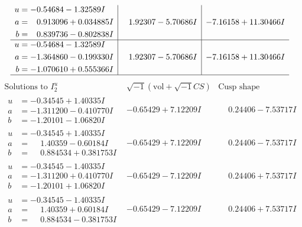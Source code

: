 \documentclass[1p]{elsarticle_modified}
\theoremstyle{definition}
\newcommand{\I}{\sqrt{-1}}
\begin{document}
$$\begin{array}{c|c|c}
\begin{aligned}
u &= -0.54684 - 1.32589 I \\
a &= \phantom{-}0.913096 + 0.034885 I \\
b &= \phantom{-}0.839736 - 0.802838 I\end{aligned}
 & \phantom{-}1.92307 - 5.70686 I & -7.16158 + 11.30466 I \\ \hline\begin{aligned}
u &= -0.54684 - 1.32589 I \\
a &= -1.364860 - 0.199330 I \\
b &= -1.070610 + 0.555366 I\end{aligned}
 & \phantom{-}1.92307 - 5.70686 I & -7.16158 + 11.30466 I\\
 \hline 
 \end{array}$$\newpage$$\begin{array}{c|c|c}  
\text{Solutions to }I^u_{2}& \I (\text{vol} + \sqrt{-1}CS) & \text{Cusp shape}\\
 \hline 
\begin{aligned}
u &= -0.34545 + 1.40335 I \\
a &= -1.311200 - 0.410770 I \\
b &= -1.20101 - 1.06820 I\end{aligned}
 & -0.65429 + 7.12209 I & \phantom{-}0.24406 - 7.53717 I \\ \hline\begin{aligned}
u &= -0.34545 + 1.40335 I \\
a &= \phantom{-}1.40359 - 0.60184 I \\
b &= \phantom{-}0.884534 + 0.381753 I\end{aligned}
 & -0.65429 + 7.12209 I & \phantom{-}0.24406 - 7.53717 I \\ \hline\begin{aligned}
u &= -0.34545 - 1.40335 I \\
a &= -1.311200 + 0.410770 I \\
b &= -1.20101 + 1.06820 I\end{aligned}
 & -0.65429 - 7.12209 I & \phantom{-}0.24406 + 7.53717 I \\ \hline\begin{aligned}
u &= -0.34545 - 1.40335 I \\
a &= \phantom{-}1.40359 + 0.60184 I \\
b &= \phantom{-}0.884534 - 0.381753 I\end{aligned}
 & -0.65429 - 7.12209 I & \phantom{-}0.24406 + 7.53717 I \\ \hline\begin{aligned}

\end{aligned}
\end{array}$$
\end{document}
